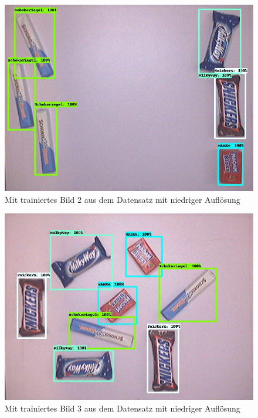     \begin{figure}[H]
        \centering
        \includegraphics[angle = 90, width = \textwidth]{Bilder/models/model_comparison/faster_rcnn_resnet50_v1_640x640_coco17_tpu-8/trained_2.jpg}
        \caption{Mit trainiertes Bild 2 aus dem Datensatz mit niedriger Auflösung}
    \end{figure}
    
    \begin{figure}[H]
        \centering
        \includegraphics[angle = 90, width = \textwidth]{Bilder/models/model_comparison/faster_rcnn_resnet50_v1_640x640_coco17_tpu-8/trained_3.jpg}
        \caption{Mit trainiertes Bild 3 aus dem Datensatz mit niedriger Auflösung}
    \end{figure}
    
